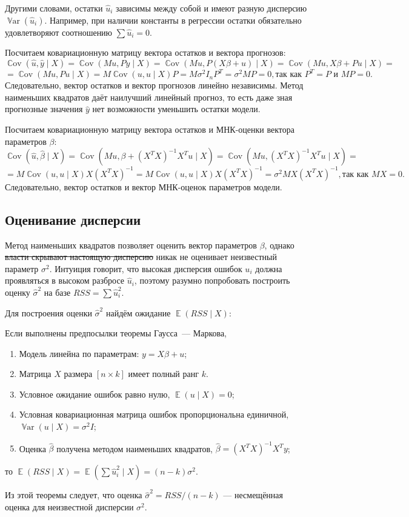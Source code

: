 \documentclass[12pt]{article}
\DeclareMathOperator{\Cov}{\mathbb{C}ov}
\DeclareMathOperator{\Var}{\mathbb{V}ar}
\DeclareMathOperator{\E}{\mathbb{E}}
\newcommand{\hb}{\hat{\beta}}
\newcommand{\hu}{\hat{u}}
\newcommand{\hy}{\hat{y}}
\newcommand{\RSS}{RSS}
\newcommand{\gaussmarkov}{
\begin{enumerate}[label=\arabic*.]
    \item Модель линейна по параметрам: $y = X\beta + u$;
    \item Матрица $X$ размера $[n \times k]$ имеет полный ранг $k$.
    \item Условное ожидание ошибок равно нулю, $\E(u\mid X) = 0$;
    \item Условная ковариационная матрица ошибок пропорциональна единичной, $\Var(u\mid X) = \sigma^2 I$;
    \item Оценка $\hb$ получена методом наименьших квадратов, $\hb = (X^T X)^{-1}X^T y$;
\end{enumerate}}
\begin{document}
Другими словами, остатки $\hu_i$ зависимы между собой и имеют разную дисперсию $\Var(\hu_i)$.
Например, при наличии константы в регрессии остатки обязательно удовлетворяют соотношению $\sum \hu_i = 0$.

Посчитаем ковариационную матрицу вектора остатков и вектора прогнозов:
\[
\Cov(\hu, \hy \mid X) = \Cov(M u, Py \mid X) = \Cov(M u, P(X\beta + u) \mid X) = \Cov(M u, X\beta + Pu \mid X) =
\]
\[
=\Cov(Mu, Pu \mid X) = M \Cov(u,u \mid X) P = M \sigma^2I_n P^{T} = \sigma^2MP = 0, \text{так как } P^{T} = P \text{ и } MP = 0.
\]
Следовательно, вектор остатков и вектор прогнозов линейно независимы. Метод наименьших квадратов даёт наилучший линейный прогноз, то есть даже зная прогнозные значения $\hy$ нет возможности уменьшить остатки модели.

Посчитаем ковариационную матрицу вектора остатков и МНК-оценки вектора параметров $\beta$:
\[
\Cov(\hu, \hb \mid X) = \Cov(M u, \beta + (X^{T}X)^{-1}X^{T}u \mid X) = \Cov(Mu,(X^{T}X)^{-1}X^{T}u \mid X) = 
\]
\[
=M\Cov(u, u \mid X) X(X^{T}X)^{-1} = M\Cov(u,u \mid X) X(X^{T}X)^{-1} = \sigma^2 MX(X^{T}X)^{-1}, \text{так как } MX = 0.
\]
Следовательно, вектор остатков и вектор МНК-оценок параметров модели.

\subsection{Оценивание дисперсии}

Метод наименьших квадратов позволяет оценить вектор параметров $\beta$, однако \sout{власти скрывают настоящую дисперсию} никак не оценивает неизвестный параметр $\sigma^2$.
Интуиция говорит, что высокая дисперсия ошибок $u_i$ должна проявляться в высоком разбросе $\hat u_i$, поэтому разумно попробовать построить оценку $\hat\sigma^2$ на базе $\RSS = \sum \hat u_i^2$.

Для построения оценки $\hat\sigma^2$ найдём ожидание $\E(\RSS \mid X)$:
\begin{theorem}
Если выполнены предпосылки теоремы Гаусса~— Маркова, 
\gaussmarkov
то $\E(\RSS \mid X) = \E(\sum \hu_i^2 \mid X) = (n - k) \sigma^2$.
\end{theorem}
Из этой теоремы следует, что оценка $\hat \sigma^2 = \RSS/ (n - k)$ — несмещённая оценка для неизвестной дисперсии $\sigma^2$.
\end{document}
